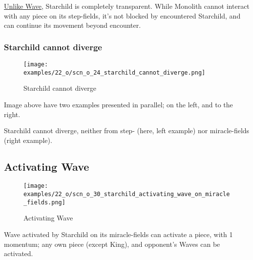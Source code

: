 \vspace*{-0.4\baselineskip}
\hyperref[fig:scn_d_02_monolith_first_step]{Unlike Wave}, Starchild is completely
transparent. While Monolith cannot interact with any piece on its step-fields, it's
not blocked by encountered Starchild, and can continue its movement beyond encounter.

\clearpage %

\subsubsection*{Starchild cannot diverge}
\label{sec:One/Starchild/Divergence/Starchild cannot diverge}

\vspace*{-1.4\baselineskip}
\noindent
\begin{figure}[!h]
\texttt{[image: examples/22\_o/scn\_o\_24\_starchild\_cannot\_diverge.png]}
\vspace*{-1.3\baselineskip}
\caption{Starchild cannot diverge}
\label{fig:scn_o_24_starchild_cannot_diverge}
\end{figure}

\vspace*{-0.4\baselineskip}
Image above have two examples presented in parallel; on the left, and to the right.

Starchild cannot diverge, neither from step- (here, left example) nor miracle-fields
(right example).

\clearpage %

\subsection*{Activating Wave}
\label{sec:One/Starchild/Activating Wave}

\noindent
\begin{wrapfigure}[8]{l}{0.4\textwidth}
\centering
\texttt{[image: examples/22\_o/scn\_o\_30\_starchild\_activating\_wave\_on\_miracle\_fields.png]}
\caption{Activating Wave}
\label{fig:scn_o_30_starchild_activating_wave_on_miracle_fields}
\end{wrapfigure}
Wave activated by Starchild on its miracle-fields can activate a piece, with
1 momentum; any own piece (except King), and opponent's Waves can be activated.


